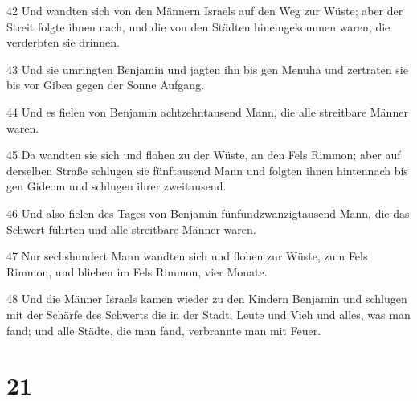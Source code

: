 \par 42 Und wandten sich von den Männern Israels auf den Weg zur Wüste; aber der Streit folgte ihnen nach, und die von den Städten hineingekommen waren, die verderbten sie drinnen.
\par 43 Und sie umringten Benjamin und jagten ihn bis gen Menuha und zertraten sie bis vor Gibea gegen der Sonne Aufgang.
\par 44 Und es fielen von Benjamin achtzehntausend Mann, die alle streitbare Männer waren.
\par 45 Da wandten sie sich und flohen zu der Wüste, an den Fels Rimmon; aber auf derselben Straße schlugen sie fünftausend Mann und folgten ihnen hintennach bis gen Gideom und schlugen ihrer zweitausend.
\par 46 Und also fielen des Tages von Benjamin fünfundzwanzigtausend Mann, die das Schwert führten und alle streitbare Männer waren.
\par 47 Nur sechshundert Mann wandten sich und flohen zur Wüste, zum Fels Rimmon, und blieben im Fels Rimmon, vier Monate.
\par 48 Und die Männer Israels kamen wieder zu den Kindern Benjamin und schlugen mit der Schärfe des Schwerts die in der Stadt, Leute und Vieh und alles, was man fand; und alle Städte, die man fand, verbrannte man mit Feuer.

\chapter{21}

